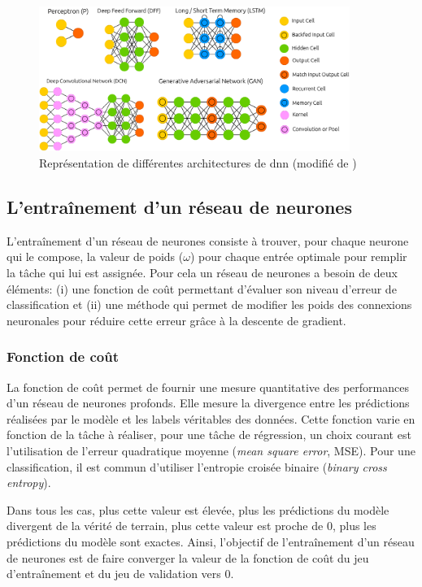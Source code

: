 \begin{figure}[!ht]
 \centering
 \includegraphics[width=0.9\textwidth]{figures/dnn_archi.png}
 \caption[Représentation de différentes architectures de \gls{dnn}]{Représentation de différentes architectures de \gls{dnn} (modifié de \cite{leijnen_neural_2016})}
 \label{fig:dnn_archi}
\end{figure}


\subsection{L'entraînement d'un réseau de neurones}
L'entraînement d'un réseau de neurones consiste à trouver, pour chaque neurone qui le compose, la valeur de poids ($\omega$) pour chaque entrée optimale pour remplir la tâche qui lui est assignée. Pour cela un réseau de neurones a besoin de deux éléments: (i) une fonction de coût permettant d'évaluer son niveau d'erreur de classification et (ii) une méthode qui permet de modifier les poids des connexions neuronales pour réduire cette erreur grâce à la descente de gradient.

\subsubsection{Fonction de coût}
La fonction de coût permet de fournir une mesure quantitative des performances d'un réseau de neurones profonds. Elle mesure la divergence entre les prédictions réalisées par le modèle et les labels véritables des données. Cette fonction varie en fonction de la tâche à réaliser, pour une tâche de régression, un choix courant est l'utilisation de l'erreur quadratique moyenne (\textit{mean square error}, MSE). Pour une classification, il est commun d'utiliser l'entropie croisée binaire (\textit{binary cross entropy}). 


Dans tous les cas, plus cette valeur est élevée, plus les prédictions du modèle divergent de la vérité de terrain, plus cette valeur est proche de 0, plus les prédictions du modèle sont exactes. Ainsi, l'objectif de l'entraînement d'un réseau de neurones est de faire converger la valeur de la fonction de coût du jeu d'entraînement et du jeu de validation vers 0. 


